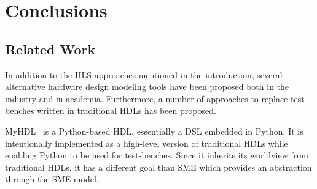 \chapter{Conclusions}





\section{Related Work}
\label{sec:retwork}


In addition to the HLS approaches mentioned in the introduction, several
alternative hardware design modeling tools have been proposed both in the
industry and in academia. Furthermore, a number of approaches to replace test
benches written in traditional HDLs has been proposed.

MyHDL~\cite{myhdl} is a Python-based HDL, essentially a DSL embedded in
Python. It is intentionally implemented as a high-level version of traditional
HDLs while enabling Python to be used for test-benches. Since it inherits its
worldview from traditional HDLs, it has a different goal than SME which provides
an abstraction through the SME model.

